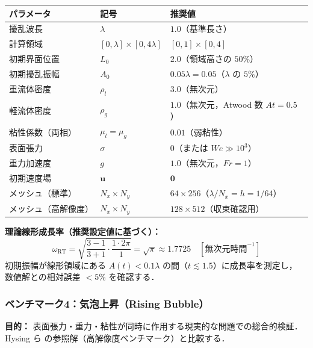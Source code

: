 \begin{tcolorbox}[mybox, title={Rayleigh--Taylor ベンチマーク：具体的パラメータ（推奨設定）}]
\begin{center}
\renewcommand{\arraystretch}{1.3}
\begin{tabular}{lll}
\hline
パラメータ & 記号 & 推奨値 \\
\hline
擾乱波長 & $\lambda$ & $1.0$（基準長さ） \\
計算領域 & $[0,\lambda]\times[0,4\lambda]$ & $[0,1]\times[0,4]$ \\
初期界面位置 & $L_0$ & $2.0$（領域高さの $50\%$） \\
初期擾乱振幅 & $A_0$ & $0.05\lambda = 0.05$（$\lambda$ の $5\%$） \\
重流体密度 & $\rho_l$ & $3.0$（無次元） \\
軽流体密度 & $\rho_g$ & $1.0$（無次元，Atwood 数 $At = 0.5$） \\
粘性係数（両相） & $\mu_l = \mu_g$ & $0.01$（弱粘性） \\
表面張力 & $\sigma$ & $0$（または $We \gg 10^3$） \\
重力加速度 & $g$ & $1.0$（無次元，$Fr = 1$） \\
初期速度場 & $\bm{u}$ & $\bm{0}$ \\
メッシュ（標準） & $N_x \times N_y$ & $64 \times 256$（$\lambda / N_x = h = 1/64$） \\
メッシュ（高解像度） & $N_x \times N_y$ & $128 \times 512$（収束確認用） \\
\hline
\end{tabular}
\end{center}

\textbf{理論線形成長率（推奨設定値に基づく）：}
\[
  \omega_{\mathrm{RT}} = \sqrt{\frac{3-1}{3+1} \cdot \frac{1 \cdot 2\pi}{1}} = \sqrt{\pi} \approx 1.7725
  \quad [\text{無次元時間}^{-1}]
\]
初期振幅が線形領域にある $A(t) < 0.1\lambda$ の間（$t \lesssim 1.5$）に成長率を測定し，
数値解との相対誤差 $< 5\%$ を確認する．
\end{tcolorbox}

\subsubsection{ベンチマーク4：気泡上昇（Rising Bubble）}
\label{sec:bench_bubble}

\textbf{目的：} 表面張力・重力・粘性が同時に作用する現実的な問題での総合的検証．
Hysing ら \cite{Hysing2009} の参照解（高解像度ベンチマーク）と比較する．

